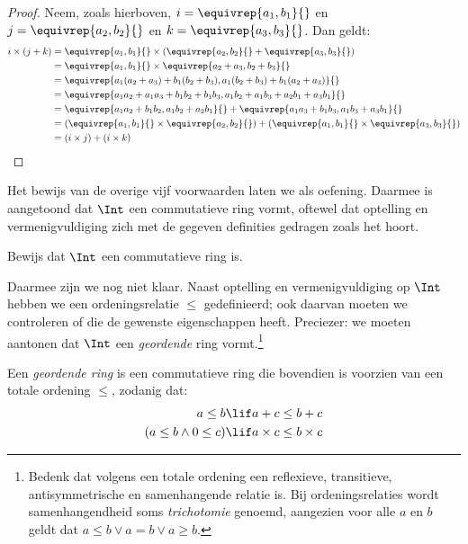 \documentclass[openany]{memoir}
\begin{document}
\begin{proof}
Neem, zoals hierboven, $i = \equivrep{a_1, b_1}{}$ en $j =
\equivrep{a_2,b_2}{}$ en $k = \equivrep{a_3, b_3}{}$. Dan geldt:
\begin{align*}
	i \times (j + k) 
	&= \equivrep{a_1, b_1}{} \times (\equivrep{a_2,b_2}{} + \equivrep{a_3, b_3}{})\\
	&= \equivrep{a_1, b_1}{} \times \equivrep{a_2 + a_3,b_2+b_3}{}\\
	&= \equivrep{a_1  (a_2 + a_3) + b_1  (b_2+b_3), a_1  (b_2 + b_3) + b_1 (a_2 + a_3)}{}\\
	&= \equivrep{a_1 a_2 + a_1a_3 + b_1 b_2+b_1b_3, a_1 b_2 + a_1b_3 + a_2b_1 + a_3b_1}{}\\		
	&= \equivrep{a_1a_2 + b_1b_2, a_1b_2 + a_2b_1}{} + \equivrep{a_1a_3 + b_1b_3, a_1b_3 + a_3b_1}{}\\
	&= (\equivrep{a_1, b_1}{} \times \equivrep{a_2,b_2}{}) + (\equivrep{a_1, b_1}{} \times  \equivrep{a_3, b_3}{})\\
	&= (i \times j) + (i \times k)
\end{align*}
\end{proof}
Het bewijs van de overige vijf voorwaarden laten we als oefening.
Daarmee is aangetoond dat $\Int$ een commutatieve ring vormt, oftewel
dat optelling en vermenigvuldiging zich met de gegeven definities
gedragen zoals het hoort.
\begin{prob}
Bewijs dat $\Int$ een commutatieve ring is.
\end{prob}
Daarmee zijn we nog niet klaar. Naast optelling en vermenigvuldiging
op $\Int$ hebben we een ordeningsrelatie $\leq$ gedefinieerd; ook
daarvan moeten we controleren of die de gewenste eigenschappen
heeft. Preciezer: we moeten aantonen dat $\Int$ een \emph{geordende}
ring vormt.\footnote{Bedenk dat volgens
	 een totale ordening
	een reflexieve, transitieve, antisymmetrische en samenhangende relatie is.
	Bij ordeningsrelaties wordt samenhangendheid soms
	\emph{trichotomie} genoemd, aangezien voor alle $a$ en $b$ geldt dat $a \leq b \lor a
	= b \lor a \geq b$.} 
\begin{defn}
Een \emph{geordende ring} is een commutatieve ring die bovendien is
voorzien van een totale ordening $\leq$, zodanig dat:
\begin{align*}
	a \leq b &\lif a + c \leq b + c\\
	(a \leq b \land 0 \leq c) &\lif a \times c \leq b \times c
\end{align*}
\end{defn}
\end{document}
